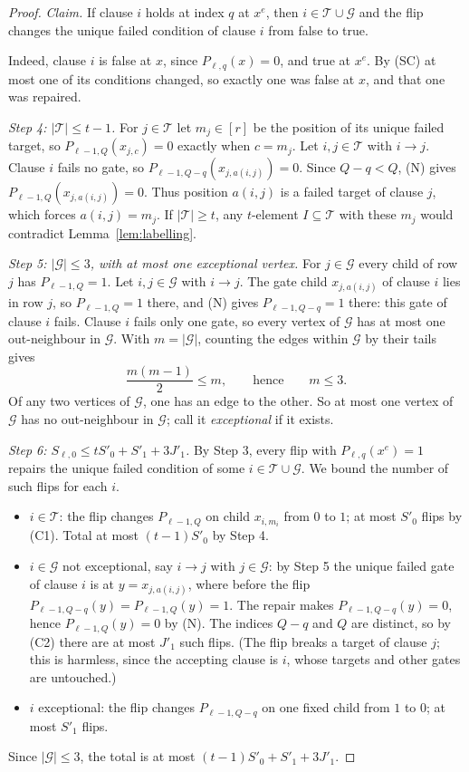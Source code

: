 \documentclass[11pt]{article}
\theoremstyle{definition}
\theoremstyle{remark}
\begin{document}
\begin{proof}
\emph{Claim.} If clause $i$ holds at index $q$ at $x^e$, then
$i\in\mathcal T\cup\mathcal G$ and the flip changes the unique failed
condition of clause $i$ from false to true.

Indeed, clause $i$ is false at $x$, since $P_{\ell,q}(x)=0$, and true at
$x^e$. By (SC) at most one of its conditions changed, so exactly one was
false at $x$, and that one was repaired.

\emph{Step 4: $|\mathcal T|\le t-1$.}
For $j\in\mathcal T$ let $m_j\in[r]$ be the position of its unique failed
target, so $P_{\ell-1,Q}(x_{j,c})=0$ exactly when $c=m_j$. Let
$i,j\in\mathcal T$ with $i\to j$. Clause $i$ fails no gate, so
$P_{\ell-1,Q-q}(x_{j,a(i,j)})=0$. Since $Q-q<Q$, (N) gives
$P_{\ell-1,Q}(x_{j,a(i,j)})=0$. Thus position $a(i,j)$ is a failed target of
clause $j$, which forces $a(i,j)=m_j$. If $|\mathcal T|\ge t$, any
$t$-element $I\subseteq\mathcal T$ with these $m_j$ would contradict
Lemma~\ref{lem:labelling}.

\emph{Step 5: $|\mathcal G|\le3$, with at most one exceptional vertex.}
For $j\in\mathcal G$ every child of row $j$ has $P_{\ell-1,Q}=1$. Let
$i,j\in\mathcal G$ with $i\to j$. The gate child $x_{j,a(i,j)}$ of clause
$i$ lies in row $j$, so $P_{\ell-1,Q}=1$ there, and (N) gives
$P_{\ell-1,Q-q}=1$ there: this gate of clause $i$ fails. Clause $i$ fails
only one gate, so every vertex of $\mathcal G$ has at most one out-neighbour
in $\mathcal G$. With $m=|\mathcal G|$, counting the edges within
$\mathcal G$ by their tails gives
\[
 \frac{m(m-1)}2\le m,\qquad\text{hence}\qquad m\le3.
\]
Of any two vertices of $\mathcal G$, one has an edge to the other. So at most
one vertex of $\mathcal G$ has no out-neighbour in $\mathcal G$; call it
\emph{exceptional} if it exists.

\emph{Step 6: $S_{\ell,0}\le tS'_0+S'_1+3J'_1$.}
By Step 3, every flip with $P_{\ell,q}(x^e)=1$ repairs the unique failed
condition of some $i\in\mathcal T\cup\mathcal G$. We bound the number of such
flips for each $i$.
\begin{itemize}[nosep]
\item $i\in\mathcal T$: the flip changes $P_{\ell-1,Q}$ on child $x_{i,m_i}$
from $0$ to $1$; at most $S'_0$ flips by (C1). Total at most $(t-1)S'_0$ by
Step 4.
\item $i\in\mathcal G$ not exceptional, say $i\to j$ with $j\in\mathcal G$:
by Step 5 the unique failed gate of clause $i$ is at $y=x_{j,a(i,j)}$, where
before the flip $P_{\ell-1,Q-q}(y)=P_{\ell-1,Q}(y)=1$. The repair makes
$P_{\ell-1,Q-q}(y)=0$, hence $P_{\ell-1,Q}(y)=0$ by (N). The indices $Q-q$
and $Q$ are distinct, so by (C2) there are at most $J'_1$ such flips. (The
flip breaks a target of clause $j$; this is harmless, since the accepting
clause is $i$, whose targets and other gates are untouched.)
\item $i$ exceptional: the flip changes $P_{\ell-1,Q-q}$ on one fixed child
from $1$ to $0$; at most $S'_1$ flips.
\end{itemize}
Since $|\mathcal G|\le3$, the total is at most $(t-1)S'_0+S'_1+3J'_1$.


\end{proof}
\end{document}
